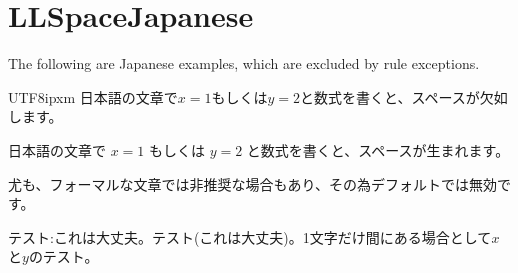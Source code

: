 \section{LLSpaceJapanese}

The following are Japanese examples, which are excluded by rule exceptions.

\begin{CJK}{UTF8}{ipxm}
	日本語の文章で$x=1$もしくは\(y=2\)と数式を書くと、スペースが欠如します。

	日本語の文章で $x=1$ もしくは \(y=2\) と数式を書くと、スペースが生まれます。

	尤も、フォーマルな文章では非推奨な場合もあり、その為デフォルトでは無効です。

	テスト:これは大丈夫。テスト(これは大丈夫)。1文字だけ間にある場合として$x$と$y$のテスト。
\end{CJK}
